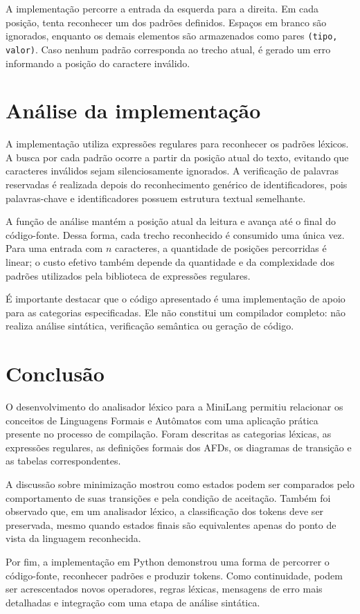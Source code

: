 \documentclass[12pt,a4paper]{article}
\begin{document}
A implementação percorre a entrada da esquerda para a direita. Em cada
posição, tenta reconhecer um dos padrões definidos. Espaços em branco são
ignorados, enquanto os demais elementos são armazenados como pares
\texttt{(tipo, valor)}. Caso nenhum padrão corresponda ao trecho atual, é
gerado um erro informando a posição do caractere inválido.

\section{Análise da implementação}

A implementação utiliza expressões regulares para reconhecer os padrões
léxicos. A busca por cada padrão ocorre a partir da posição atual do texto,
evitando que caracteres inválidos sejam silenciosamente ignorados. A
verificação de palavras reservadas é realizada depois do reconhecimento
genérico de identificadores, pois palavras-chave e identificadores possuem
estrutura textual semelhante.

A função de análise mantém a posição atual da leitura e avança até o final
do código-fonte. Dessa forma, cada trecho reconhecido é consumido uma única
vez. Para uma entrada com $n$ caracteres, a quantidade de posições
percorridas é linear; o custo efetivo também depende da quantidade e da
complexidade dos padrões utilizados pela biblioteca de expressões regulares.

É importante destacar que o código apresentado é uma implementação de apoio
para as categorias especificadas. Ele não constitui um compilador completo:
não realiza análise sintática, verificação semântica ou geração de código.

\section{Conclusão}

O desenvolvimento do analisador léxico para a MiniLang permitiu relacionar
os conceitos de Linguagens Formais e Autômatos com uma aplicação prática
presente no processo de compilação. Foram descritas as categorias léxicas,
as expressões regulares, as definições formais dos AFDs, os diagramas de
transição e as tabelas correspondentes.

A discussão sobre minimização mostrou como estados podem ser comparados
pelo comportamento de suas transições e pela condição de aceitação. Também
foi observado que, em um analisador léxico, a classificação dos tokens deve
ser preservada, mesmo quando estados finais são equivalentes apenas do ponto
de vista da linguagem reconhecida.

Por fim, a implementação em Python demonstrou uma forma de percorrer o
código-fonte, reconhecer padrões e produzir tokens. Como continuidade,
podem ser acrescentados novos operadores, regras léxicas, mensagens de erro
mais detalhadas e integração com uma etapa de análise sintática.
\end{document}
